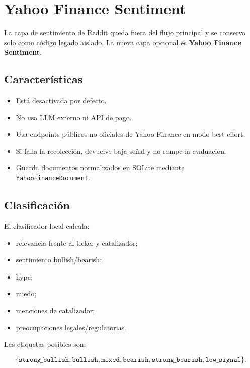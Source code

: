 \documentclass[11pt,letterpaper]{article}
\begin{document}
\section{Yahoo Finance Sentiment}

La capa de sentimiento de Reddit queda fuera del flujo principal y se conserva
solo como c\'odigo legado aislado. La nueva capa opcional es
\textbf{Yahoo Finance Sentiment}.

\subsection{Caracter\'isticas}

\begin{itemize}[noitemsep]
  \item Est\'a desactivada por defecto.
  \item No usa LLM externo ni API de pago.
  \item Usa endpoints p\'ublicos no oficiales de Yahoo Finance en modo
        best-effort.
  \item Si falla la recolecci\'on, devuelve baja se\~nal y no rompe la evaluaci\'on.
  \item Guarda documentos normalizados en SQLite mediante
        \texttt{YahooFinanceDocument}.
\end{itemize}

\subsection{Clasificaci\'on}

El clasificador local calcula:

\begin{itemize}[noitemsep]
  \item relevancia frente al ticker y catalizador;
  \item sentimiento bullish/bearish;
  \item hype;
  \item miedo;
  \item menciones de catalizador;
  \item preocupaciones legales/regulatorias.
\end{itemize}

Las etiquetas posibles son:

\[
\{\texttt{strong\_bullish},\texttt{bullish},\texttt{mixed},
\texttt{bearish},\texttt{strong\_bearish},\texttt{low\_signal}\}.
\]
\end{document}
